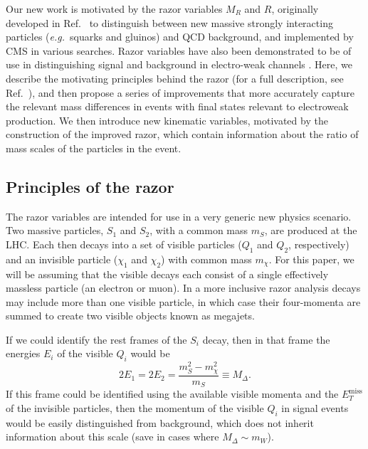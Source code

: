 Our new work is motivated by the razor variables $M_R$ and $R$, originally developed in Ref.~\cite{Rogan:2010kb,Chatrchyan:2011ek}  to distinguish between new massive strongly interacting particles ({\it e.g.}~squarks and gluinos) and QCD background, and implemented by CMS \cite{CMS:2012dwa,Chatrchyan:2012gq} in various searches. Razor variables have also been demonstrated to be of use in distinguishing signal and background in electro-weak channels \cite{Fox:2012ee}. Here, we describe the motivating principles behind the razor (for a full description, see Ref.~\cite{roganthesis}), and then propose a series of improvements that more accurately capture the relevant mass differences in events with final states relevant to electroweak production. We then introduce new kinematic variables, motivated by the construction of the improved razor, which contain information about the ratio of mass scales of the particles in the event.

\subsection{Principles of the razor}

The razor variables are intended for use in a very generic new physics scenario. Two massive particles, $S_1$ and $S_2$, with a common mass $m_S$, are produced at the LHC. Each then decays into a set of visible particles ($Q_1$ and $Q_2$, respectively) and an invisible particle ($\chi_1$ and $\chi_2$) with common mass $m_\chi$. For this paper, we will be assuming that the visible decays each consist of a single effectively massless particle (an electron or muon). In a more inclusive razor analysis decays may include more than one visible particle, in which case their four-momenta are summed to create two visible objects known as megajets.

If we could identify the rest frames of the $S_i$ decay, then in that frame the energies $E_i$ of the visible $Q_i$ would be 
\begin{equation}
2E_1 = 2E_2 = \frac{m_S^2-m_\chi^2}{m_S} \equiv M_\Delta.
\end{equation}
If this frame could be identified using the available visible momenta and the $E_{T}^\text{miss}$ of the invisible particles, then the momentum of the visible $Q_i$ in signal events would be easily distinguished from background, which does not inherit information about this scale (save in cases where $M_\Delta \sim m_W$).

